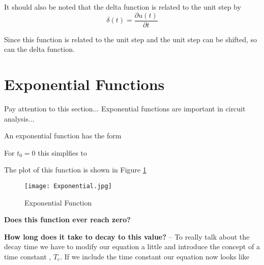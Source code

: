 \documentclass{handout}
\begin{document}
It should also be noted that the delta function is related to the unit step by
\begin{equation}
\delta (t) = \frac{\partial u(t)}{\partial t}
\end{equation}

Since this function is related to the unit step and the unit step can be shifted, so can the delta function.

\newpage
\clearpage
\pagebreak

\section{Exponential Functions}
Pay attention to this section... Exponential functions are important in circuit analysis...

An exponential function has the form

For $t_0 =0$ this simplfies to

The plot of this function is shown in Figure \ref{fig: Exponential}
\begin{figure} [h!]
\centering
\texttt{[image: Exponential.jpg]}
\caption{Exponential Function}
\label{fig: Exponential}
\end{figure}

\textbf{Does this function ever reach zero?}

\textbf{How long does it take to decay to this value?} -- To really talk about the decay time we have to modify our equation a little and introduce the concept of a time constant , $T_c$.  If we include the time constant our equation now looks like
\end{document}
